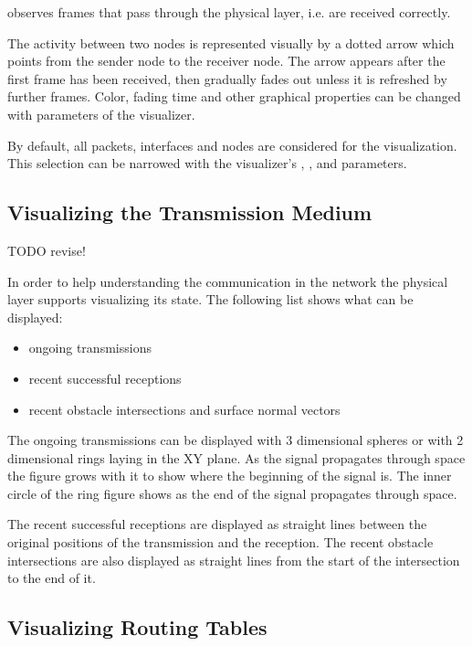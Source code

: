  observes frames that pass through the physical layer,
i.e. are received correctly.

The activity between two nodes is represented visually by a dotted arrow which
points from the sender node to the receiver node. The arrow appears after the
first frame has been received, then gradually fades out unless it is refreshed
by further frames. Color, fading time and other graphical properties can be
changed with parameters of the visualizer.

By default, all packets, interfaces and nodes are considered for the
visualization. This selection can be narrowed with the visualizer's
, , and  parameters.

\ifdraft
\subsection{Visualizing the Transmission Medium}

TODO revise!

In order to help understanding the communication in the network the physical
layer supports visualizing its state. The following list shows what can be
displayed:

\begin{itemize}
  \item ongoing transmissions
  \item recent successful receptions
  \item recent obstacle intersections and surface normal vectors
\end{itemize}

The ongoing transmissions can be displayed with 3 dimensional spheres or with 2
dimensional rings laying in the XY plane. As the signal propagates through space
the figure grows with it to show where the beginning of the signal is. The inner
circle of the ring figure shows as the end of the signal propagates through
space. 

The recent successful receptions are displayed as straight lines between the
original positions of the transmission and the reception. The recent obstacle
intersections are also displayed as straight lines from the start of the
intersection to the end of it.
\fi

\subsection{Visualizing Routing Tables}
\label{sec:visualization:routing-tables}

